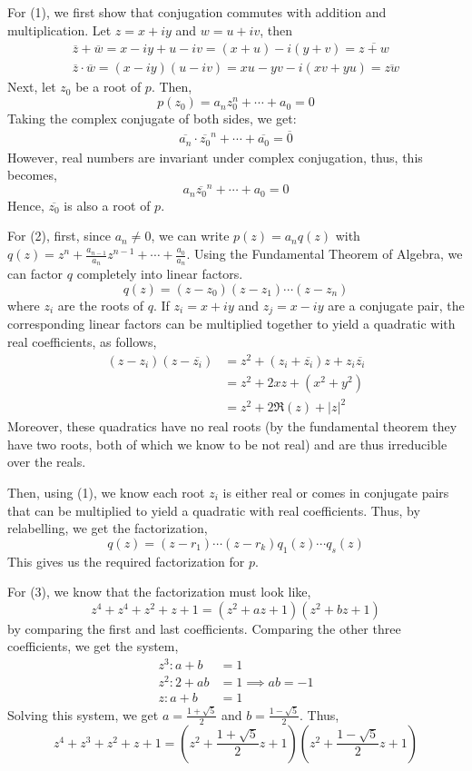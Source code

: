\documentclass[12pt]{amsart}
\begin{document}
\begin{solution}
    For (1), we first show that conjugation commutes with addition and multiplication. Let $z = x+iy$ and $w = u+iv$, then
    \begin{align*}
        \overline{z} + \overline{w} = x-iy + u-iv = (x+u) -i(y+v) = \overline{z+w} \\
        \overline{z} \cdot \overline{w} = (x-iy)(u-iv) = xu-yv-i(xv+yu) = \overline{zw}
    \end{align*}
    Next, let $z_0$ be a root of $p$. Then, 
    \[ p(z_0) = a_nz_0^n + \cdots + a_0 = 0 \]
    Taking the complex conjugate of both sides, we get:
    \begin{align*}
        \overline{a_n}\cdot \overline{z_0}^n + \cdots + \overline{a_0} = \overline{0}
    \end{align*}
    However, real numbers are invariant under complex conjugation, thus, this becomes,
    \[ a_n\overline{z_0}^n + \cdots + a_0 = 0 \]
    Hence, $\overline{z_0}$ is also a root of $p$.

    For (2), first, since $a_n \neq 0$, we can write $p(z) = a_nq(z)$ with $q(z) = z^n + \frac{a_{n-1}}{a_n}z^{n-1} + \cdots + \frac{a_0}{a_n}$. Using the Fundamental Theorem of Algebra, we can factor $q$ completely into linear factors. 
    \[ q(z) = (z-z_0)(z-z_1)\cdots (z-z_n)\]
    where $z_i$ are the roots of $q$. If $z_i = x + iy $ and $z_j = x -iy$ are a conjugate pair, the corresponding linear factors can be multiplied together to yield a quadratic with real coefficients, as follows, 
    \begin{align*}
        (z-z_i)(z-\overline{z_i}) &= z^2 + (z_i+\overline{z_i})z + z_i\overline{z_i} \\
        &= z^2 + 2xz + (x^2+y^2) \\
        &= z^2 + 2\Re(z) + |z|^2 
    \end{align*}
    Moreover, these quadratics have no real roots (by the fundamental theorem they have two roots, both of which we know to be not real) and are thus irreducible over the reals.

    Then, using (1), we know each root $z_i$ is either real or comes in conjugate pairs that can be multiplied to yield a quadratic with real coefficients. Thus, by relabelling, we get the factorization,
    \[ q(z) = (z-r_1)\cdots(z-r_k)q_1(z)\cdots q_s(z)\]
    This gives us the required factorization for $p$. 

    For (3), we know that the factorization must look like, 
    \[ z^4 + z^4 + z^2 + z + 1 = (z^2 + az+1)(z^2+bz+1)\]
    by comparing the first and last coefficients. Comparing the other three coefficients, we get the system, 
    \begin{align*}
        z^3: a + b &= 1 \\
        z^2: 2+ab &= 1 \implies ab = -1 \\
        z: a+b  &= 1
    \end{align*}
    Solving this system, we get $a = \frac{1+\sqrt{5}}{2}$ and $b = \frac{1-\sqrt{5}}{2}$. Thus, 
    \[ z^4 + z^3 + z^2 + z + 1 = \left(z^2 + \frac{1+\sqrt{5}}{2}z + 1\right)\left(z^2 + \frac{1-\sqrt{5}}{2}z + 1\right)\]
\end{solution}
\newpage
\end{document}
